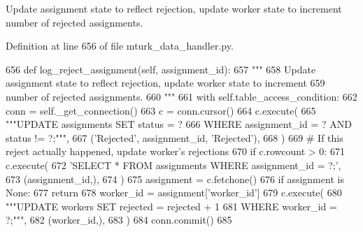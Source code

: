 \begin{DoxyVerb}Update assignment state to reflect rejection, update worker state to increment
number of rejected assignments.
\end{DoxyVerb}
 

Definition at line 656 of file mturk\+\_\+data\+\_\+handler.\+py.


\begin{DoxyCode}
656     \textcolor{keyword}{def }log\_reject\_assignment(self, assignment\_id):
657         \textcolor{stringliteral}{"""}
658 \textcolor{stringliteral}{        Update assignment state to reflect rejection, update worker state to increment}
659 \textcolor{stringliteral}{        number of rejected assignments.}
660 \textcolor{stringliteral}{        """}
661         with self.table\_access\_condition:
662             conn = self.\_get\_connection()
663             c = conn.cursor()
664             c.execute(
665                 \textcolor{stringliteral}{"""UPDATE assignments SET status = ?}
666 \textcolor{stringliteral}{                         WHERE assignment\_id = ? AND status != ?;"""},
667                 (\textcolor{stringliteral}{'Rejected'}, assignment\_id, \textcolor{stringliteral}{'Rejected'}),
668             )
669             \textcolor{comment}{# If this reject actually happened, update worker's rejections}
670             \textcolor{keywordflow}{if} c.rowcount > 0:
671                 c.execute(
672                     \textcolor{stringliteral}{'SELECT * FROM assignments WHERE assignment\_id = ?;'},
673                     (assignment\_id,),
674                 )
675                 assignment = c.fetchone()
676                 \textcolor{keywordflow}{if} assignment \textcolor{keywordflow}{is} \textcolor{keywordtype}{None}:
677                     \textcolor{keywordflow}{return}
678                 worker\_id = assignment[\textcolor{stringliteral}{'worker\_id'}]
679                 c.execute(
680                     \textcolor{stringliteral}{"""UPDATE workers SET rejected = rejected + 1}
681 \textcolor{stringliteral}{                             WHERE worker\_id = ?;"""},
682                     (worker\_id,),
683                 )
684             conn.commit()
685 
\end{DoxyCode}
\mbox{\label{classparlai_1_1mturk_1_1core_1_1mturk__data__handler_1_1MTurkDataHandler_a532f8c2794a6eccf008e7ed9c945e2cb}} 
